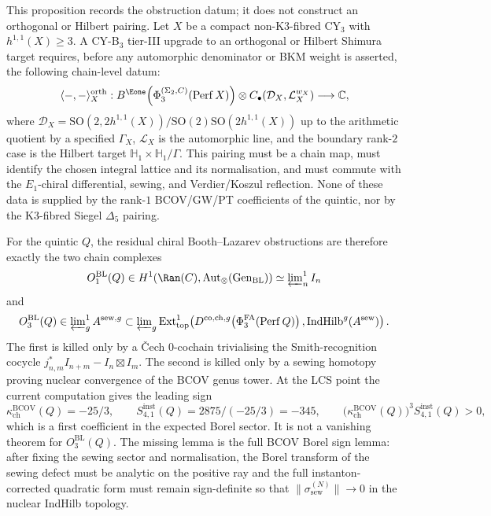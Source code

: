 \begin{proposition}
\label{prop:cy-b3-tieriii-quintic-bl-obstruction}
This proposition records the obstruction datum; it does not construct
an orthogonal or Hilbert pairing.
Let $X$ be a compact non-K$3$-fibred CY$_3$ with $h^{1,1}(X) \geq 3$.
A CY-B$_3$ tier-III upgrade to an orthogonal or Hilbert Shimura target
requires, before any automorphic denominator or BKM weight is asserted,
the following chain-level datum:
\[
 \langle -,-\rangle_X^{\mathrm{orth}}:
 B^{\Eone}\!\left(\Phi_3^{(\Sigma_2,C)}(\mathrm{Perf}\,X)\right)
 \otimes C_\bullet(\mathcal D_X,\mathcal L_X^{w_X})
 \longrightarrow \mathbb C,
\]
where $\mathcal D_X=\mathrm{SO}(2,2h^{1,1}(X))/
\mathrm{SO}(2)\mathrm{SO}(2h^{1,1}(X))$ up to the arithmetic quotient
by a specified $\Gamma_X$, $\mathcal L_X$ is the automorphic line, and
the boundary rank-$2$ case is the Hilbert target
$\mathbb H_1\times\mathbb H_1/\Gamma$. This pairing must be a chain map,
must identify the chosen integral lattice and its normalisation, and must
commute with the $E_1$-chiral differential, sewing, and Verdier/Koszul
reflection. None of these data is supplied by the rank-$1$ BCOV/GW/PT
coefficients of the quintic, nor by the K$3$-fibred Siegel
$\Delta_5$ pairing.

For the quintic $Q$, the residual chiral Booth--Lazarev obstructions are
therefore exactly the two chain complexes
\[
 O_1^{\mathrm{BL}}(Q)
 \in H^1\!\left(\Ran(C),\mathrm{Aut}_\otimes(\mathrm{Gen}_{\mathrm{BL}})\right)
 \simeq \varprojlim\nolimits^1_n I_n
\]
and
\[
 O_3^{\mathrm{BL}}(Q)
 \in
 \varprojlim\nolimits^1_g A^{\mathrm{sew},g}
 \subset
 \varprojlim\nolimits_g
 \mathrm{Ext}^1_{\mathrm{top}}\!\left(
 D^{\mathrm{co,ch},g}\!\left(\Phi^{\mathrm{FA}}_3(\mathrm{Perf}\,Q)\right),
 \mathrm{IndHilb}^g(A^{\mathrm{sew}})
 \right).
\]
The first is killed only by a \v{C}ech $0$-cochain trivialising the
Smith-recognition cocycle
$j_{n,m}^* I_{n+m}-I_n\boxtimes I_m$. The second is killed only by a
sewing homotopy proving nuclear convergence of the BCOV genus tower. At
the LCS point the current computation gives the leading sign
\[
 \kappa_{\mathrm{ch}}^{\mathrm{BCOV}}(Q)=-25/3,\qquad
 S_{4,1}^{\mathrm{inst}}(Q)=2875/(-25/3)=-345,\qquad
 \bigl(\kappa_{\mathrm{ch}}^{\mathrm{BCOV}}(Q)\bigr)^3
 S_{4,1}^{\mathrm{inst}}(Q)>0,
\]
which is a first coefficient in the expected Borel sector. It is not a
vanishing theorem for $O_3^{\mathrm{BL}}(Q)$. The missing lemma is the
full BCOV Borel sign lemma: after fixing the sewing sector and
normalisation, the Borel transform of the sewing defect must be analytic
on the positive ray and the full instanton-corrected quadratic form must
remain sign-definite so that
$\|\sigma_{\mathrm{sew}}^{(N)}\|\to0$ in the nuclear IndHilb topology.
\end{proposition}

